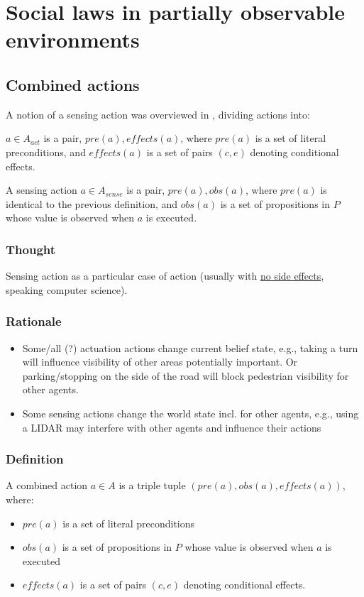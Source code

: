 \documentclass[fleqn,10pt]{olplainarticle}
\begin{document}
\section{Social laws in partially observable environments}
\subsection{Combined actions}
A notion of a sensing action was overviewed in \cite{maliah_partially_2014}, dividing actions into:
\begin{description}[font=\bfseries]
\item [Actuation action] $a \in A_{act}$ is a pair, ${pre(a), effects(a)}$, where $pre(a)$ is a set of literal preconditions, and $effects(a)$ is a set of pairs $(c, e)$ denoting conditional effects.
\item [Sensing action] A sensing action $a \in A_{sense}$ is a pair, ${pre(a), obs(a)}$, where $pre(a)$ is identical to the previous definition, and $obs(a)$ is a set of propositions in $P$ whose value is observed when $a$ is executed.
\end{description}
\subsubsection{Thought}
Sensing action as a particular case of action (usually with \href{https://en.wikipedia.org/wiki/Side_effect_(computer_science)}{no side effects}, speaking computer science). 
\subsubsection{Rationale}
\begin{itemize}
    \item Some/all (?) actuation actions change current belief state, e.g., taking a turn will influence visibility of other areas potentially important. Or parking/stopping on the side of the road will block pedestrian visibility for other agents.
    \item Some sensing actions change the world state incl. for other agents, e.g., using a LIDAR may interfere with other agents and influence their actions \cite{bhupathiraju_emi-lidar_2023}
\end{itemize}
\subsubsection{Definition}
A combined action $a\in A$ is a triple tuple $(pre(a), obs(a), effects(a))$, where:
\begin{itemize}
    \item $pre(a)$ is a set of literal preconditions
    \item $obs(a)$ is a set of propositions in $P$ whose value is observed when $a$ is executed
    \item $effects(a)$ is a set of pairs $(c, e)$ denoting conditional effects.
\end{itemize}
\end{document}
